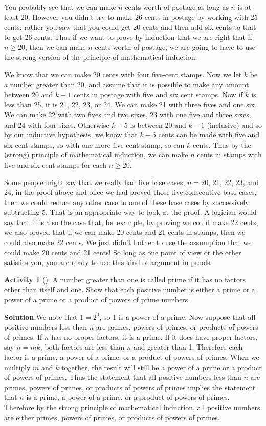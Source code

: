 \documentclass[10pt,]{book}
\theoremstyle{plain}
\theoremstyle{definition}
\newtheorem{activity}[project]{Activity}
\numberwithin{equation}{chapter}
\begin{document}
You probably see that we can make \(n\) cents worth of postage as long as \(n\) is at least 20. However you didn't try to make 26 cents in postage by working with 25 cents; rather you saw that you could get 20 cents and then add six cents to that to get 26 cents. Thus if we want to prove by induction that we are right that if \(n\ge 20\), then we can make \(n\) cents worth of postage, we are going to have to use the strong version of the principle of mathematical induction.%
\par
We know that we can make 20 cents with four five-cent stamps. Now we let \(k\) be a number greater than 20, and assume that it is possible to make any amount between 20 and \(k-1\) cents in postage with five and six cent stamps. Now if \(k\) is less than 25, it is 21, 22, 23, or 24. We can make 21 with three fives and one six. We can make 22 with two fives and two sixes, 23 with one five and three sixes, and 24 with four sixes. Otherwise \(k-5\) is between 20 and \(k-1\) (inclusive) and so by our inductive hypothesis, we know that \(k-5\) cents can be made with five and six cent stamps, so with one more five cent stamp, so can \(k\) cents. Thus by the (strong) principle of mathematical induction, we can make \(n\) cents in stamps with five and six cent stamps for each \(n\ge 20\).%
\par
Some people might say that we really had five base cases, \(n=20\), 21, 22, 23, and 24, in the proof above and once we had proved those five consecutive base cases, then we could reduce any other case to one of these base cases by successively subtracting 5. That is an appropriate way to look at the proof. A logician would say that it is also the case that, for example, by proving we could make 22 cents, we also proved that if we can make 20 cents and 21 cents in stamps, then we could also make 22 cents. We just didn't bother to use the assumption that we could make 20 cents and 21 cents! So long as one point of view or the other satisfies you, you are ready to use this kind of argument in proofs.%
\begin{activity}[]\label{activity-348}
A number greater than one is called prime if it has no factors other than itself and one. Show that each positive number is either a prime or a power of a prime or a product of powers of prime numbers.%
\par\medskip\noindent%
\textbf{Solution.}\quad We note that \(1=2^0\), so 1 is a power of a prime. Now suppose that all positive numbers less than \(n\) are primes, powers of primes, or products of powers of primes. If \(n\) has no proper factors, it is a prime.  If it does have proper factors, say \(n=mk\), both factors are less than \(n\) and greater than 1. Therefore each factor is a prime, a power of a prime, or a product of powers of primes. When we multiply \(m\) and \(k\) together, the result will still be a power of a prime or a product of powers of primes. Thus the statement that all positive numbers less than \(n\) are primes, powers of primes, or products of powers of primes implies the statement that \(n\) is a prime, a power of a prime, or a product of powers of primes. Therefore by the strong principle of mathematical induction, all positive numbers are either primes, powers of primes, or products of powers of primes.%
\end{activity}
\end{document}

